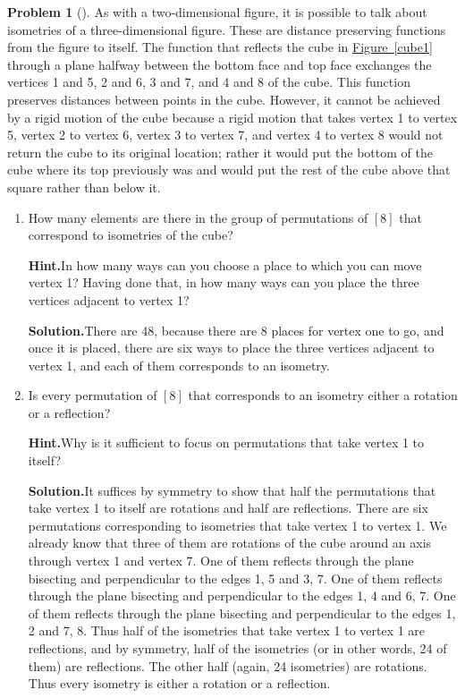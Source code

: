\documentclass[10pt,]{book}
\theoremstyle{plain}
\theoremstyle{definition}
\newtheorem{activity}[project]{Problem}
\theoremstyle{definition}
\numberwithin{equation}{chapter}
\begin{document}
\begin{activity}[]\label{activity-265}
As with a two-dimensional figure, it is possible to talk about isometries of a three-dimensional figure. These are distance preserving functions from the figure to itself. The function that reflects the cube in \hyperref[cube1]{Figure~\ref{cube1}} through a plane halfway between the bottom face and top face exchanges the vertices 1 and 5, 2 and 6, 3 and 7, and 4 and 8 of the cube. This function preserves distances between points in the cube. However, it cannot be achieved by a rigid motion of the cube because a rigid motion that takes vertex 1 to vertex 5, vertex 2 to vertex 6, vertex 3 to vertex 7, and vertex 4 to vertex 8 would not return the cube to its original location; rather it would put the bottom of the cube where its top previously was and would put the rest of the cube above that square rather than below it.%
\begin{enumerate}[font=\bfseries,label=(\alph*),ref=\alph*]
\item\label{task-193} How many elements are there in the group of permutations of \([8]\)   that correspond to isometries of the cube?%
\par\medskip\noindent%
\textbf{Hint.}\quad In how many ways can you choose a place to which you can move vertex 1? Having done that, in how many ways can you place the three vertices adjacent to vertex 1?%
\par\medskip\noindent%
\textbf{Solution.}\quad There are 48, because there are 8 places for vertex one to go, and once it is placed, there are six ways to place the three vertices adjacent to vertex 1, and each of them corresponds to an isometry.%
\item\label{task-194} Is every permutation of \([8]\) that corresponds to an isometry either a rotation or a reflection?%
\par\medskip\noindent%
\textbf{Hint.}\quad Why is it sufficient to focus on permutations that take vertex 1 to itself?%
\par\medskip\noindent%
\textbf{Solution.}\quad It suffices by symmetry to show that half the permutations that take vertex 1 to itself are rotations and half are reflections. There are six permutations corresponding to isometries that take vertex 1 to vertex 1. We already know that three of them are rotations of the cube around an axis through vertex 1 and vertex 7. One of them reflects through the plane bisecting and perpendicular to the edges 1, 5 and 3, 7. One of them reflects through the plane bisecting and perpendicular to the edges 1, 4 and 6, 7. One of them reflects through the plane bisecting and perpendicular to the edges 1, 2 and 7, 8. Thus half of the isometries that take vertex 1 to vertex 1 are reflections, and by symmetry, half of the isometries (or in other words, 24 of them) are reflections. The other half (again, 24 isometries) are rotations. Thus every isometry is either a rotation or a reflection.%
\end{enumerate}
\end{activity}
\typeout{************************************************}
\typeout{************************************************}
\end{document}
